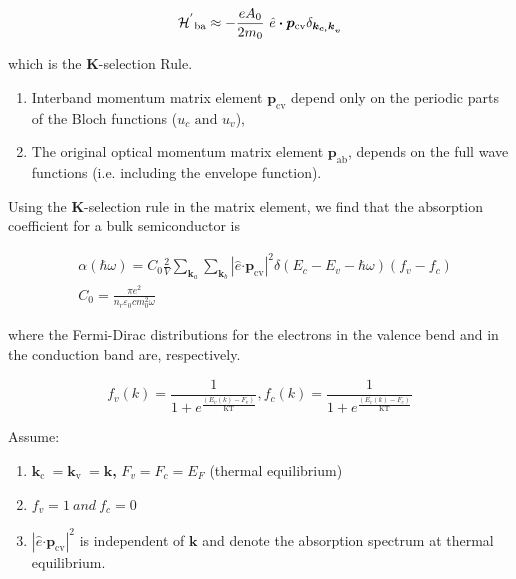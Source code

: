 \begin{equation}
{\HAM^{'}}_{\text{ba}} \approx - \frac{eA_{0}}{2m_{0}}\bm{\ }\hat{e}\bm{\cdot}\bm{p}_{\text{cv}}\delta_{{\bm{k}_{\bm{c,}}\bm{k}}_{\bm{v}}}
\end{equation}

which is the \textbf{K}-selection Rule.

\begin{enumerate}
\def\labelenumi{\arabic{enumi})}
\item
  Interband momentum matrix element \(\bm{p}_{\text{cv}}\) depend
  only on the periodic parts of the Bloch functions
  (\(u_{c}\text{\ and\ }u_{v}\)),
\item
  The original optical momentum matrix element
  \(\bm{p}_{\text{ab}}\), depends on the full wave functions (i.e.
  including the envelope function).
\end{enumerate}

Using the \textbf{K}-selection rule in the matrix element, we find that
the absorption coefficient for a bulk semiconductor is

\begin{eqnarray}
& \alpha\left( \hbar\omega \right) = C_{0}\frac{2}{V}\sum_{\bm{k}_{a}}^{}{\sum_{\bm{k}_{b}}^{}\left| \hat{e}\bm{\cdot}\bm{p}_{\text{cv}} \right|^{2}}\delta(E_{c} - E_{v} - \hbar\omega)(f_{v} - f_{c}) \nonumber \\
  & C_{0} = \frac{\pi e^{2}}{n_{r}\varepsilon_{0}cm_{0}^{2}\omega}
\end{eqnarray}

where the Fermi-Dirac distributions for the electrons in the valence
bend and in the conduction band are, respectively.

\begin{equation}
f_{v}\left( k \right) = \frac{1}{1 + e^{\frac{(E_{v}\left( k \right) - F_{v})}{\text{KT}}}}
,
f_{c}\left( k \right) = \frac{1}{1 + e^{\frac{(E_{c}\left( k \right) - F_{c})}{\text{KT}}}}
\end{equation}

Assume:

\begin{enumerate}
\def\labelenumi{\arabic{enumi})}
\item
  \(\bm{k}_{\text{c\ }} = \bm{k}_{\text{v\ }} = \bm{k}\)\textbf{,}
  \(F_{v} = F_{c} = E_{F}\) (thermal equilibrium)
\item
  \(f_{v} = 1\ and\ f_{c} = 0\)
\item
  \(\left| \hat{e}\bm{\cdot}\bm{p}_{\text{cv}} \right|^{2}\)
  is independent of \(\bm{k}\) and denote the absorption spectrum at
  thermal equilibrium.
\end{enumerate}

